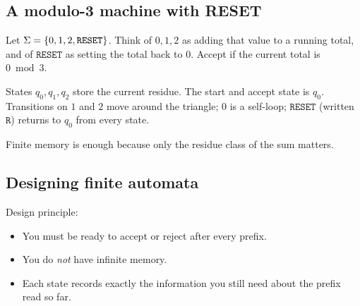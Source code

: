 \subsection{A modulo-3 machine with RESET}
\begin{example}
Let $\Sigma=\{0,1,2,\mathtt{RESET}\}$. Think of $0,1,2$ as adding that
value to a running total, and of $\mathtt{RESET}$ as setting the total back
to $0$. Accept if the current total is $0\bmod 3$.

States $q_0,q_1,q_2$ store the current residue. The start and accept state is
$q_0$. Transitions on $1$ and $2$ move around the triangle; $0$ is a self-loop;
$\mathtt{RESET}$ (written $\mathtt{R}$) returns to $q_0$ from every state.
\begin{center}
\end{center}
Finite memory is enough because only the residue class of the sum matters.
\end{example}

\subsection{Designing finite automata}
Design principle:
\begin{itemize}
  \item You must be ready to accept or reject after every prefix.
  \item You do \emph{not} have infinite memory.
  \item Each state records exactly the information you still need about the
        prefix read so far.
\end{itemize}

